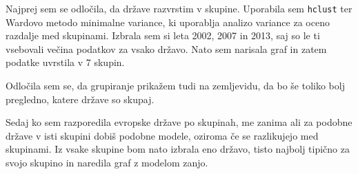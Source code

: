 \documentclass[11pt,a4paper]{article}
\begin{document}
Najprej sem se odločila, da države razvrstim v skupine. Uporabila sem \verb|hclust| ter Wardovo metodo minimalne variance, ki uporablja analizo variance za oceno razdalje med skupinami. Izbrala sem si leta 2002, 2007 in 2013, saj so le ti vsebovali večina podatkov za vsako državo. Nato sem narisala graf in zatem podatke uvrstila v 7 skupin.


\newpage
Odločila sem se, da grupiranje prikažem tudi na zemljevidu, da bo še toliko bolj pregledno, katere države so skupaj.


Sedaj ko sem razporedila evropske države po skupinah, me zanima ali za podobne države v isti skupini dobiš podobne modele, oziroma če se razlikujejo med skupinami. Iz vsake skupine bom nato izbrala eno državo, tisto najbolj tipično za svojo skupino in naredila graf z modelom zanjo.\\
\end{document}

